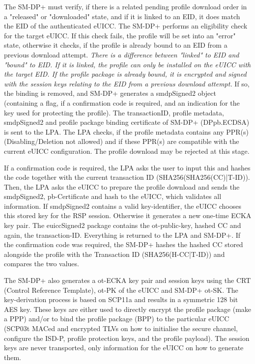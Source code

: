 The SM-DP+ must verify, if there is a related pending profile download order in a "released" or "downloaded" state, and if it is linked to an EID, it does match the EID of the authenticated eUICC. The SM-DP+ performs an eligibility check for the target eUICC. If this check fails, the profile will be set into an "error" state, otherwise it checks, if the profile is already bound to an EID from a previous download attempt. \textit{There is a difference between "linked" to EID and "bound" to EID. If it is linked, the profile can only be installed on the eUICC with the target EID. If the profile package is already bound, it is encrypted and signed with the session keys relating to the EID from a previous download attempt.} If so, the binding is removed, and SM-DP+ generates a smdpSigned2 object (containing a flag, if a confirmation code is required, and an indication for the key used for protecting the profile). The transactionID, profile metadata, smdpSigned2 and profile package binding certificate of SM-DP+ (DPpb.ECDSA) is sent to the LPA. The LPA checks, if the profile metadata contains any PPR(s) (Disabling/Deletion not allowed) and if these PPR(s) are compatible with the current eUICC configuration. The profile download may be rejected at this stage.

If a confirmation code is required, the LPA asks the user to input this and hashes the code together with the current transaction ID (SHA256(SHA256(CC)|T-ID)). Then, the LPA asks the eUICC to prepare the profile download and sends the smdpSigned2, pb-Certificate and hash to the eUICC, which validates all information. If smdpSigned2 contains a valid key-identifier, the eUICC chooses this stored key for the RSP session. Otherwise it generates a new one-time ECKA key pair. The euiccSigned2 package contains the ot-public-key, hashed CC and again, the transaction-ID. Everything is returned to the LPA and SM-DP+. If the confirmation code was required, the SM-DP+ hashes the hashed CC stored alongside the profile with the Transaction ID (SHA256(H-CC|T-ID)) and compares the two values.

The SM-DP+ also generates a ot-ECKA key pair and session keys using the CRT (Control Reference Template), ot-PK of the eUICC and SM-DP+ ot-SK. The key-derivation process is based on SCP11a \parencite{GPC:AmendF} and results in a symmetric 128 bit AES key. These keys are either used to directly encrypt the profile package (make a PPP) and/or to bind the profile package (BPP) to the particular eUICC (SCP03t MACed and encrypted TLVs on how to initialise the secure channel, configure the ISD-P, profile protection keys, and the profile payload). The session keys are never transported, only information for the eUICC on how to generate them.

